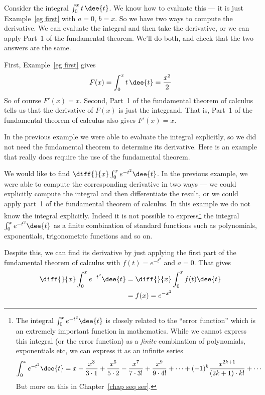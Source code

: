 \begin{eg}
Consider the integral $\int_0^x t\,\dee{t}$. We know how to evaluate this --- it is just
Example~\ref{eg first} with $a = 0$, $b = x$. So we have two ways to compute the
derivative. We can evaluate the integral and then take the derivative, or we can apply
Part~1 of the fundamental theorem. We'll do both, and check that the two answers are the
same.

First, Example~\ref{eg first} gives
\begin{align*}
         F(x) = \int_0^x  t\,\dee{t} =\frac{x^2}{2}
\end{align*}
So of course $F'(x) = x$. Second, Part~1 of the fundamental theorem
of calculus tells us that the derivative of $F(x)$ is just the integrand.
That is, Part~1 of the fundamental theorem of calculus also gives $F'(x) = x$.
\end{eg}

In the previous example we were able to evaluate the integral explicitly,
so we did not
need the fundamental theorem to determine its derivative. Here is an example that really
does require the use of the fundamental theorem.

\begin{eg}\label{eg:INTftocA}
We would like to find $\diff{}{x}\int_0^x e^{-t^2}\dee{t}$. In the previous
example, we were able to compute the corresponding derivative in two ways --- we could
explicitly compute the integral and then differentiate the result, or we could apply
part~1 of the fundamental theorem
of calculus. In this example we do not know the integral explicitly. Indeed it
is not possible to express\footnote{The integral $\int_0^x e^{-t^2}\dee{t}$ is
closely related to the ``error function'' which is an extremely important
function in mathematics. While we cannot express this integral (or the error
function) as a \emph{finite} combination of polynomials, exponentials etc, we
can express it as an infinite series
\begin{align*}
  \int_0^x e^{-t^2}\dee{t}
  &= x - \frac{x^3}{3\cdot 1} + \frac{x^5}{5\cdot 2} - \frac{x^7}{7\cdot 3!} +
\frac{x^9}{9\cdot 4!} +\cdots + (-1)^k \frac{x^{2k+1}}{(2k+1)\cdot k!} + \cdots
\end{align*}
But more on this in Chapter~\ref{chap seq ser}.} the integral $\int_0^x
e^{-t^2}\dee{t}$ as a finite combination of standard functions such as
polynomials, exponentials, trigonometric functions and so on.


Despite this, we can find its derivative by just applying the first part of
the fundamental theorem of calculus with $f(t)=e^{-t^2}$ and $a=0$.
That gives
\begin{align*}
\diff{}{x}\int_0^x e^{-t^2}\dee{t}
&=\diff{}{x}\int_0^x f(t)\dee{t}\\
&=f(x) = e^{-x^2}
\end{align*}
\end{eg}

